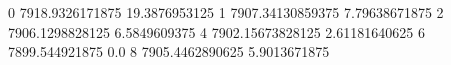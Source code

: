 0 7918.9326171875 19.3876953125
1 7907.34130859375 7.79638671875
2 7906.1298828125 6.5849609375
4 7902.15673828125 2.61181640625
6 7899.544921875 0.0
8 7905.4462890625 5.9013671875
